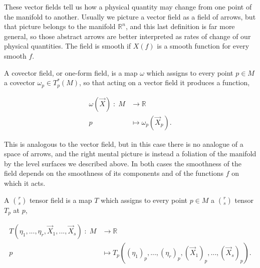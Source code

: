         These vector fields tell us how a physical quantity may change from one point of the manifold to another. Usually we picture a vector field as a field of arrows, but that picture belongs to the manifold $\mathbb{R}^n$, and this last definition is far more general, so those abstract arrows are better interpreted as rates of change of our physical quantities. The field is smooth if $X(f)$ is a smooth function for every smooth $f$.

        \begin{myDef}
            A covector field, or one-form field, is a map $\omega$ which assigns to every point $p \in M$ a covector $\omega_p \in T_p^*(M)$, so that acting on a vector field it produces a function,

            \begin{equation}
                \begin{split}
                    \omega(\Vec{X})\;:\;M &\longrightarrow \mathbb{R}\\
                    p &\longmapsto \omega_p\left(\Vec{X}_p\right).
                \end{split}
            \end{equation}
        \end{myDef}

        This is analogous to the vector field, but in this case there is no analogue of a space of arrows, and the right mental picture is instead a foliation of the manifold by the level surfaces we described above. In both cases the smoothness of the field depends on the smoothness of its components and of the functions $f$ on which it acts.

        \begin{myDef}
            A $\binom{r}{s}$ tensor field is a map $T$ which assigns to every point $p \in M$ a $\binom{r}{s}$ tensor $T_p$ at $p$,

            \begin{equation}
                \begin{split}
                    T(\eta_1,...,\eta_r,\Vec{X}_1,...,\Vec{X}_s)\;:\;M &\longrightarrow \mathbb{R}\\
                    p &\longmapsto T_p\left((\eta_1)_p ,...,(\eta_r)_p,(\Vec{X}_1)_p,...,(\Vec{X}_s)_p\right).
                \end{split}
            \end{equation}
        \end{myDef}

